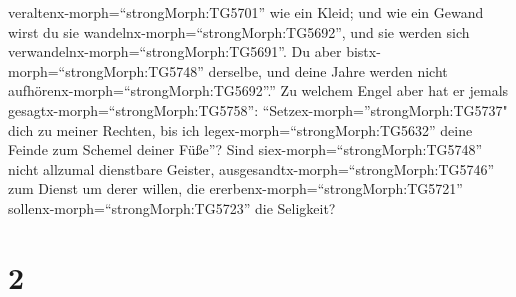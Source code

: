 veraltenx-morph=``strongMorph:TG5701'' wie ein Kleid;  und
wie ein Gewand wirst du sie wandelnx-morph=``strongMorph:TG5692'', und
sie werden sich verwandelnx-morph=``strongMorph:TG5691''. Du aber
bistx-morph=``strongMorph:TG5748'' derselbe, und deine Jahre werden
nicht aufhörenx-morph=``strongMorph:TG5692''.''  Zu welchem
Engel aber hat er jemals gesagtx-morph=``strongMorph:TG5758'':
``Setzex-morph=''strongMorph:TG5737" dich zu meiner Rechten, bis ich
legex-morph=``strongMorph:TG5632'' deine Feinde zum Schemel deiner
Füße''?  Sind siex-morph=``strongMorph:TG5748'' nicht
allzumal dienstbare Geister, ausgesandtx-morph=``strongMorph:TG5746''
zum Dienst um derer willen, die ererbenx-morph=``strongMorph:TG5721''
sollenx-morph=``strongMorph:TG5723'' die Seligkeit?

\hypertarget{section-1}{%
\section{2}\label{section-1}}

